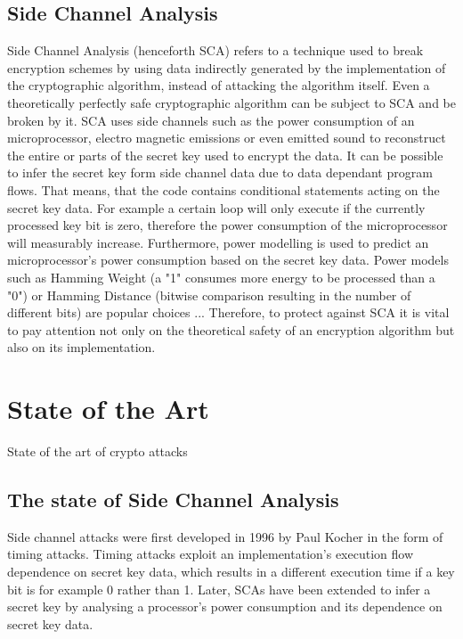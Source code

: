\documentclass[journal]{IEEEtran}
\begin{document}
\subsection{Side Channel Analysis}
Side Channel Analysis (henceforth SCA) refers to a technique used to break encryption schemes by using data indirectly generated by the implementation of the cryptographic algorithm, instead of attacking the algorithm itself. Even a theoretically perfectly safe cryptographic algorithm can be subject to SCA and be broken by it. SCA uses side channels such as the power consumption of an microprocessor, electro magnetic emissions or even emitted sound to reconstruct the entire or parts of the secret key used to encrypt the data. It can be possible to infer the secret key form side channel data due to data dependant program flows. That means, that the code contains conditional statements acting on the secret key data. For example a certain loop will only execute if the currently processed key bit is zero, therefore the power consumption of the microprocessor will measurably increase. Furthermore, power modelling is used to predict an microprocessor's power consumption based on the secret key data. Power models such as Hamming Weight (a "1" consumes more energy to be processed than a "0") or Hamming Distance (bitwise comparison resulting in the number of different bits) are popular choices ... Therefore, to protect against SCA it is vital to pay attention not only on the theoretical safety of an encryption algorithm but also on its implementation.

\section{State of the Art}
State of the art of crypto attacks

\subsection{The state of Side Channel Analysis}
Side channel attacks were first developed in 1996 by Paul Kocher \cite{first-sca:kocher} in the form of timing attacks. Timing attacks exploit an implementation's execution flow dependence on secret key data, which results in a different execution time if a key bit is for example 0 rather than 1. Later, SCAs have been extended to infer a secret key by analysing a processor's power consumption and its dependence on secret key data. 
\end{document}
